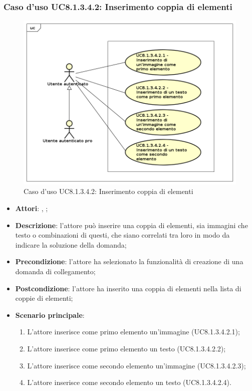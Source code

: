 	\subsubsection{Caso d'uso UC8.1.3.4.2: Inserimento coppia di elementi}
	\label{UC8.1.3.4.2}
	\begin{figure}[h]
		\centering
		\includegraphics[scale=0.5,keepaspectratio]{UML/UC8_1_3_4_2.png}
		\caption{Caso d'uso UC8.1.3.4.2: Inserimento coppia di elementi}
	\end{figure}
	\FloatBarrier
	\begin{itemize}
		\item \textbf{Attori}: \uau, \uaupro;
		\item \textbf{Descrizione}: l'attore può inserire una coppia di elementi, sia immagini che testo o combinazioni di questi, che siano correlati tra loro in modo da indicare la soluzione della domanda; 
		\item \textbf{Precondizione}: l'attore ha selezionato la funzionalità di creazione di una domanda di collegamento;
		\item \textbf{Postcondizione}: l'attore ha inserito una coppia di elementi nella lista di coppie di elementi; 
		\item \textbf{Scenario principale}: 
		\begin{enumerate}
			\item L'attore inserisce come primo elemento un'immagine (UC8.1.3.4.2.1);
			\item L'attore inserisce come primo elemento un testo (UC8.1.3.4.2.2);
			\item L'attore inserisce come secondo elemento un'immagine (UC8.1.3.4.2.3);
			\item L'attore inserisce come secondo elemento un testo (UC8.1.3.4.2.4).	
		\end{enumerate}
	\end{itemize}
	
